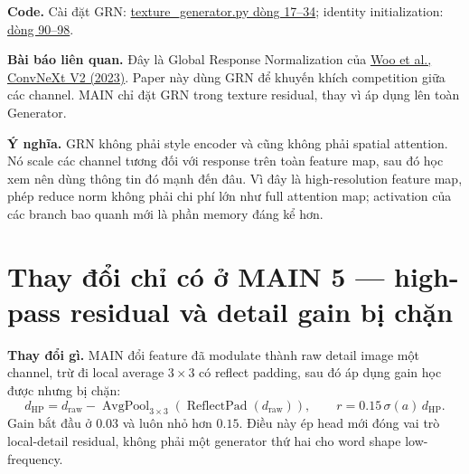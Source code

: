 \documentclass[10pt,a4paper]{article}
\newcommand{\paper}[2]{\href{#1}{#2}}
\begin{document}
\textbf{Code.} Cài đặt GRN: \href{https://github.com/rquq/HGGAN_test/blob/main/networks/texture_generator.py\#L17-L34}{texture\_generator.py dòng 17--34}; identity initialization: \href{https://github.com/rquq/HGGAN_test/blob/main/networks/texture_generator.py\#L90-L98}{dòng 90--98}.

\textbf{Bài báo liên quan.} Đây là Global Response Normalization của \paper{https://arxiv.org/abs/2301.00808}{Woo et al., ConvNeXt V2 (2023)}. Paper này dùng GRN để khuyến khích competition giữa các channel. MAIN chỉ đặt GRN trong texture residual, thay vì áp dụng lên toàn Generator.

\begin{center}
\end{center}

\textbf{Ý nghĩa.} GRN không phải style encoder và cũng không phải spatial attention. Nó scale các channel tương đối với response trên toàn feature map, sau đó học xem nên dùng thông tin đó mạnh đến đâu. Vì đây là high-resolution feature map, phép reduce norm không phải chi phí lớn như full attention map; activation của các branch bao quanh mới là phần memory đáng kể hơn.

\section{Thay đổi chỉ có ở MAIN 5 --- high-pass residual và detail gain bị chặn}

\textbf{Thay đổi gì.} MAIN đổi feature đã modulate thành raw detail image một channel, trừ đi local average $3\times3$ có reflect padding, sau đó áp dụng gain học được nhưng bị chặn:
\[
 d_{\mathrm{HP}}=d_{\mathrm{raw}}-\operatorname{AvgPool}_{3\times3}\!\left(\operatorname{ReflectPad}(d_{\mathrm{raw}})\right),\qquad
 r=0.15\,\sigma(a)\,d_{\mathrm{HP}}.
\]
Gain bắt đầu ở $0.03$ và luôn nhỏ hơn $0.15$. Điều này ép head mới đóng vai trò local-detail residual, không phải một generator thứ hai cho word shape low-frequency.
\end{document}
